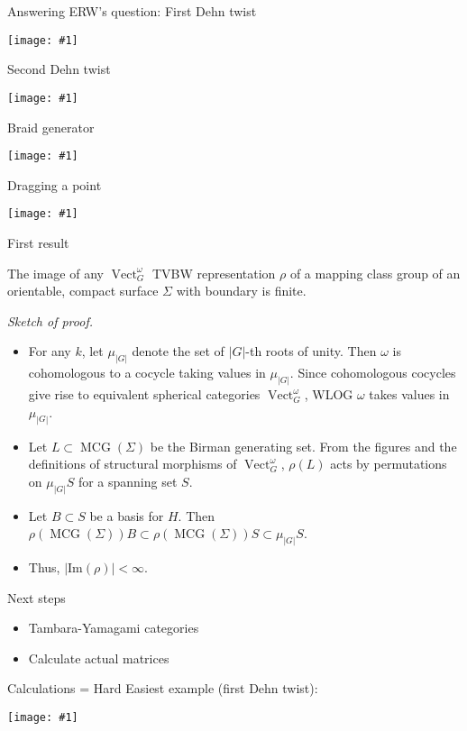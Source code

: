 \documentclass{beamer}
\renewcommand{\Im}{\mathrm{Im}}
\DeclareMathOperator{\MCG}{MCG}
\DeclareMathOperator{\Vect}{Vect}
\newcommand{\img}[1]{
\vfill
\texttt{[image: \#1]}
\vfill
}
\begin{document}
\begin{frame}{Answering ERW's question: First Dehn twist}
\img{t1}
\end{frame}

\begin{frame}{Second Dehn twist}
\img{t2}
\end{frame}

\begin{frame}{Braid generator}
\img{t3}
\end{frame}

\begin{frame}{Dragging a point}
\img{t4}
\end{frame}

\begin{frame}{First result}

\begin{theorem}
The image of any $\Vect^\omega_G$ TVBW representation $\rho$ of a mapping class group of an orientable, compact surface $\Sigma$ with boundary is finite.
\end{theorem}

\emph{Sketch of proof.}  

\begin{itemize}
\item For any $k$, let $\mu_{|G|}$ denote the set of $|G|$-th roots of unity. Then $\omega$ is cohomologous to a cocycle taking values in $\mu_{|G|}$.  Since cohomologous cocycles give rise to equivalent spherical categories $\Vect^\omega_G$, WLOG $\omega$ takes values in $\mu_{|G|}$.

\pause \item  Let $L \subset \MCG(\Sigma)$ be the Birman generating set. From the figures and the definitions of structural morphisms of $\Vect_G^\omega$,  $\rho(L)$ acts by permutations on $\mu_{|G|} S$ for a spanning set $S$.

\pause \item Let $B \subset S$ be a basis for $H$. Then $\rho(\MCG(\Sigma)) B \subset \rho(\MCG(\Sigma)) S \subset \mu_{|G|}  S$.
 
 \pause \item   Thus, $|\Im(\rho)| < \infty$.
\end{itemize}

\end{frame}

\begin{frame}{Next steps}
\begin{itemize}
\item Tambara-Yamagami categories
\item Calculate actual matrices 
\end{itemize}
\end{frame}

\begin{frame}{Calculations = Hard}
Easiest example (first Dehn twist):
\img{hard}
\end{frame}
\end{document}
